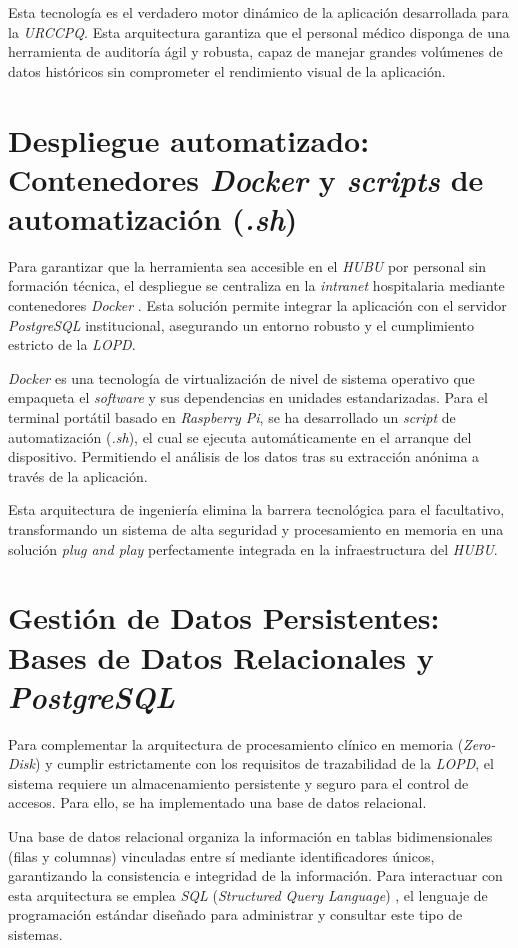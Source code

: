 Esta tecnología es el verdadero motor dinámico de la aplicación desarrollada para la \textit{URCCPQ}. Esta arquitectura garantiza que el personal médico disponga de una herramienta de auditoría ágil y robusta, capaz de manejar grandes volúmenes de datos históricos sin comprometer el rendimiento visual de la aplicación. \cite{WebSocket}

\section{Despliegue automatizado: Contenedores \textit{Docker} y \textit{scripts} de automatización (\textit{.sh})}
Para garantizar que la herramienta sea accesible en el \textit{HUBU} por personal sin formación técnica, el despliegue se centraliza en la \textit{intranet} hospitalaria mediante contenedores \textit{Docker} \cite{docker}. Esta solución permite integrar la aplicación con el servidor \textit{PostgreSQL} institucional, asegurando un entorno robusto y el cumplimiento estricto de la \textit{LOPD}.

\textit{Docker} es una tecnología de virtualización de nivel de sistema operativo que empaqueta el \textit{software} y sus dependencias en unidades estandarizadas. Para el terminal portátil basado en \textit{Raspberry Pi}, se ha desarrollado un \textit{script} de automatización (\textit{.sh}), el cual se ejecuta automáticamente en el arranque del dispositivo. Permitiendo el análisis de los datos tras su extracción anónima a través de la aplicación.

Esta arquitectura de ingeniería elimina la barrera tecnológica para el facultativo, transformando un sistema de alta seguridad y procesamiento en memoria en una solución \textit{plug and play} perfectamente integrada en la infraestructura del \textit{HUBU}.

\section{Gestión de Datos Persistentes: Bases de Datos Relacionales y \textit{PostgreSQL}}
Para complementar la arquitectura de procesamiento clínico en memoria (\textit{Zero-Disk}) y cumplir estrictamente con los requisitos de trazabilidad de la \textit{LOPD}, el sistema requiere un almacenamiento persistente y seguro para el control de accesos. Para ello, se ha implementado una base de datos relacional. \cite{relacional}

Una base de datos relacional organiza la información en tablas bidimensionales (filas y columnas) vinculadas entre sí mediante identificadores únicos, garantizando la consistencia e integridad de la información. Para interactuar con esta arquitectura se emplea \textit{SQL} (\textit{Structured Query Language}) \cite{sql}, el lenguaje de programación estándar diseñado para administrar y consultar este tipo de sistemas.

